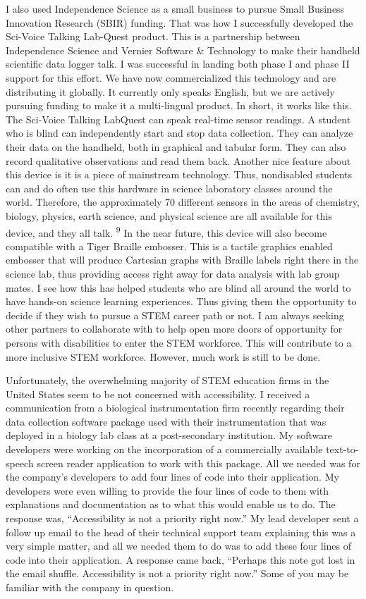\documentclass[11.5pt]{sig-alternate} %
\begin{document}
\begin{large}
I also used Independence Science as a small business to pursue Small Business Innovation Research (SBIR) funding. That was how I successfully developed the Sci-Voice Talking Lab-Quest product. This is a partnership between Independence Science and Vernier Software \& Technology to make their handheld scientific data logger talk. I was successful in landing both phase I and phase II support for this effort. We have now commercialized this technology and are distributing it globally. It currently only speaks English, but we are actively pursuing funding to make it a multi-lingual product. In short, it works like this.  The Sci-Voice Talking LabQuest can speak real-time sensor readings. A student who is blind can independently start and stop data collection. They can analyze their data on the handheld, both in graphical and tabular form. They can also record qualitative observations and read them back. Another nice feature about this device is it is a piece of mainstream technology. Thus, nondisabled students can and do often use this hardware in science laboratory classes around the world. Therefore, the approximately 70 different sensors in the areas of chemistry, biology, physics, earth science, and physical science are all available for this device, and they all talk. \textsuperscript{9} In the near future, this device will also become compatible with a Tiger Braille embosser. This is a tactile graphics enabled embosser that will produce Cartesian graphs with Braille labels right there in the science lab, thus providing access right away for data analysis with lab group mates. I see how this has helped students who are blind all around the world to have hands-on science learning experiences. Thus giving them the opportunity to decide if they wish to pursue a STEM career path or not. I am always seeking other partners to collaborate with to help open more doors of opportunity for persons with disabilities to enter the STEM workforce. This will contribute to a more inclusive STEM workforce. However, much work is still to be done. 

Unfortunately, the overwhelming majority of STEM education firms in the United States seem to be not concerned with accessibility. I received a communication from a biological instrumentation firm recently regarding their data collection software package used with their instrumentation that was deployed in a biology lab class at a post-secondary institution. My software developers were working on the incorporation of a commercially available text-to-speech screen reader application to work with this package. All we needed was for the company’s developers to add four lines of code into their application. My developers were even willing to provide the four lines of code to them with explanations and documentation as to what this would enable us to do. The response was, “Accessibility is not a priority right now.” My lead developer sent a follow up email to the head of their technical support team explaining this was a very simple matter, and all we needed them to do was to add these four lines of code into their application. A response came back, “Perhaps this note got lost in the email shuffle. Accessibility is not a priority right now.” Some of you may be familiar with the company in question. 


\end{large}
\end{document}
